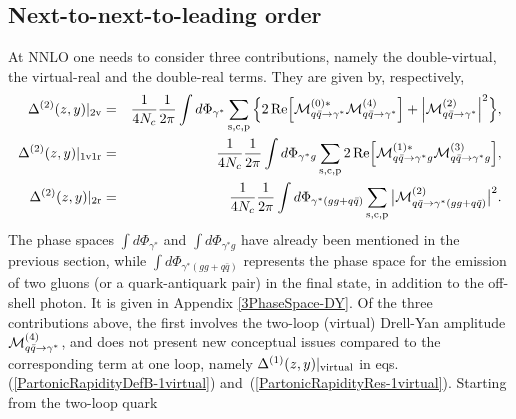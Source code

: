 \documentclass[11pt]{article}
\newcommand{\bea}{\begin{eqnarray}}
\newcommand{\eea}{\end{eqnarray}}
\newcommand\eqns[2]    {eqs.\,(\ref{#1}) and~(\ref{#2})}
\begin{document}

\subsection{Next-to-next-to-leading order}
\label{sec:NNLO1r1v}

At NNLO one needs to consider three contributions, 
namely the double-virtual, the virtual-real and the 
double-real terms. They are given by, respectively, 
\bea
\label{PartonicRapidityDefB-2virtual}
\Delta^{(2)}(z,y)|_{\rm 2v} &=& 
\frac{1}{4N_c} \frac{1}{2\pi} 
\int d \Phi_{\gamma^*} 
\sum_{\rm s,c,p}
\Big\{
2\,{\rm Re}\Big[{\cal M}_{q\bar q \to \gamma^*}^{(0)*}
{\cal M}_{q\bar q \to \gamma^*}^{(4)} \Big]
+\Big|{\cal M}_{q\bar q \to \gamma^*}^{(2)}
\Big|^2\Big\}, \\ 
\label{PartonicRapidityDefB-1v1r}
\Delta^{(2)}(z,y)|_{\rm 1v1r} &=& 
\frac{1}{4N_c} \frac{1}{2\pi} 
\int d\Phi_{\gamma^*g} 
\sum_{\rm s,c,p}
2\,{\rm Re}\Big[{\cal M}_{q\bar q \to \gamma^*g}^{(1)*}
{\cal M}_{q\bar q \to \gamma^*g}^{(3)}\Big], \\ 
\label{PartonicRapidityDefB-2real}
\Delta^{(2)}(z,y)|_{\rm 2r} &=& 
\frac{1}{4N_c}\frac{1}{2\pi}  
\int d\Phi_{\gamma^*(gg + q\bar q)} 
\sum_{\rm s,c,p}
\big|{\cal M}_{q\bar q \to \gamma^* (gg + q\bar q)}^{(2)}\big|^2.
\eea
The phase spaces $\int d\Phi_{\gamma^*}$
and $\int d\Phi_{\gamma^*g}$ have already 
been mentioned in the previous section, while 
$\int d\Phi_{\gamma^*(gg + q\bar q)}$ represents the 
phase space for the emission of two gluons 
(or a quark-antiquark pair) in the final state, 
in addition to the off-shell photon. It is given 
in Appendix \ref{3PhaseSpace-DY}. Of the three 
contributions above, the first involves the 
two-loop (virtual) Drell-Yan amplitude 
${\cal M}_{q\bar q \to \gamma^*}^{(4)}$, 
and does not present new conceptual issues 
compared to the corresponding term at one loop, 
namely $\Delta^{(1)}(z,y)|_{\rm virtual}$ in 
\eqns{PartonicRapidityDefB-1virtual}{PartonicRapidityRes-1virtual}.
Starting from the two-loop quark 
\end{document}
